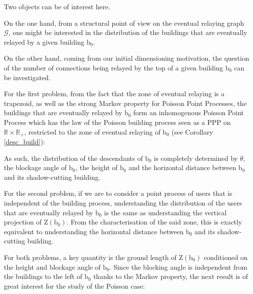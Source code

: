 \documentclass[10pt,english,a4paper]{smfart}
\theoremstyle{definition}
\theoremstyle{remark}
\newcommand{\R}{\mathbb{R}}
\newcommand{\Half}{\R \times \R_+}
\newcommand{\graph}{\mathcal{G}}
\newcommand{\zone}{\mathrm{Z}}
\begin{document}
Two objects can be of interest here.

On the one hand, from a structural point of view on the eventual relaying graph $\graph$, one might be interested in the distribution of the buildings that are eventually relayed by a given building $\mathrm{b}_0$.

On the other hand, coming from our initial dimensioning motivation, the question of the number of connections being relayed by the top of a given building $\mathrm{b}_0$ can be investigated.

For the first problem, from the fact that the zone of eventual relaying is a trapezoid, as well as the strong Markov property for Poisson Point Processes, the buildings that are eventually relayed by $\mathrm{b}_0$ form an inhomogenous Poisson Point Process which has the law of the Poisson building process seen as a PPP on $\Half$, restricted to the zone of eventual relaying of $\mathrm{b}_0$ (see Corollary \ref{desc_build}):

As such, the distribution of the descendants of $\mathrm{b}_0$ is completely determined by $\theta$, the blockage angle of $\mathrm{b}_0$, the height of $\mathrm{b}_0$ and the horizontal distance between $\mathrm{b}_0$ and its shadow-cutting building.

For the second problem, if we are to consider a point process of users that is independent of the building process, understanding the distribution of the users that are eventually relayed by $\mathrm{b}_0$ is the same as understanding the vertical projection of $\zone(\mathrm{b}_0)$. From the characterisation of the said zone, this is exactly equivalent to understanding the horizontal distance between $\mathrm{b}_0$ and its shadow-cutting building.

For both problems, a key quantity is the ground length of $\zone(\mathrm{b}_0)$ conditioned on the height and blockage angle of $\mathrm{b}_0$. Since the blocking angle is independent from the buildings to the left of $\mathrm{b}_0$ thanks to the Markov property, the next result is of great interest for the study of the Poisson case:
\end{document}
